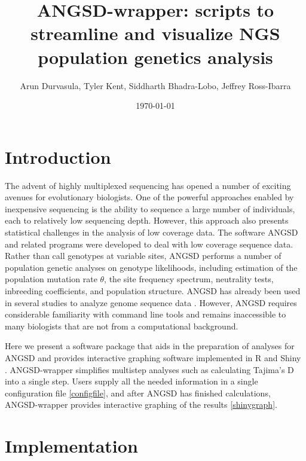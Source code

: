 \documentclass[final]{beamer}
\title
[BAPG XI, 6 December 2014, Davis, CA, USA] %
{ %
ANGSD-wrapper: scripts to streamline and visualize NGS population genetics analysis
}
\author{ %
Arun Durvasula\inst{1}, Tyler Kent\inst{1}, Siddharth Bhadra-Lobo\inst{1}, Jeffrey Ross-Ibarra\inst{2}
}
\institute
[University of California, Davis] %
{
\inst{1} Dept. of Plant Sciences, University of California Davis\\[0.3ex]
\inst{2} Dept. of Plant Sciences, Center for Population Biology, and Genome Center, University of California Davis\\[0.3ex]
}
\date{\today}
\begin{document}
\begin{frame}[t]
\begin{multicols}{3}

\section{Introduction}

The advent of highly multiplexed sequencing has opened a number of exciting avenues for evolutionary biologists. 
One of the powerful approaches enabled by inexpensive sequencing is the ability to sequence a large number of individuals, each to relatively low sequencing depth. 
However, this approach also presents statistical challenges in the analysis of low coverage data.  
The software ANGSD \cite{Korneliussen} and related programs \cite{Fumagalli} were developed to deal with low coverage sequence data. %
Rather than call genotypes at variable sites, ANGSD performs a number of population genetic analyses on genotype likelihoods, including estimation of the population mutation rate $\theta$, the site frequency spectrum, neutrality tests, inbreeding coefficients, and population structure.
ANGSD has already been used in several studies to analyze genome sequence data \cite{Crawford} \cite{Lohmueller}. %
However, ANGSD requires considerable familiarity with command line tools and remains inaccessible to many biologists that are not from a computational background. 

Here we present a software package that aids in the preparation of analyses for ANGSD and provides interactive graphing software implemented in R \cite{R} and Shiny \cite{Shiny}.  %
ANGSD-wrapper simplifies multistep analyses such as calculating Tajima’s D into a single step.
Users supply all the needed information in a single configuration file \ref{configfile}, and after ANGSD has finished calculations, ANGSD-wrapper provides interactive graphing of the results \ref{shinygraph}.

\section{Implementation}


\end{multicols}
\end{frame}
\end{document}
